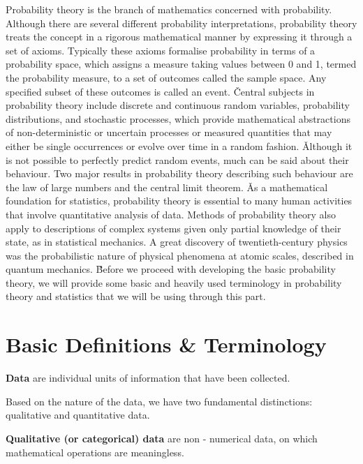 Probability theory is the branch of mathematics concerned with probability. Although there are several different
probability interpretations, probability theory treats the concept in a rigorous mathematical manner by expressing it
through a set of axioms. Typically these axioms formalise probability in terms of a probability space, which assigns
a measure taking values between 0 and 1, termed the probability measure, to a set of outcomes called the sample space.
Any specified subset of these outcomes is called an event. \v

Central subjects in probability theory include discrete and continuous random variables, probability distributions,
and stochastic processes, which provide mathematical abstractions of non-deterministic or uncertain processes or
measured quantities that may either be single occurrences or evolve over time in a random fashion. \v

Although it is not possible to perfectly predict random events, much can be said about their behaviour. Two major
results in probability theory describing such behaviour are the law of large numbers and the central limit theorem. \v

As a mathematical foundation for statistics, probability theory is essential to many human activities that involve
quantitative analysis of data. Methods of probability theory also apply to descriptions of complex systems given only
partial knowledge of their state, as in statistical mechanics. A great discovery of twentieth-century physics was the
probabilistic nature of physical phenomena at atomic scales, described in quantum mechanics. \v

Before we proceed with developing the basic probability theory,  we will provide some basic and heavily used
terminology in probability theory and statistics that we will be using through this part.

\section{Basic Definitions \& Terminology}

\bd[Data]
\textbf{Data} are individual units of information that have been collected.
\ed

Based on the nature of the data, we have two fundamental distinctions: qualitative and quantitative data.

\textbf{Qualitative (or categorical) data} are non - numerical data, on which mathematical operations are meaningless.
\ed

